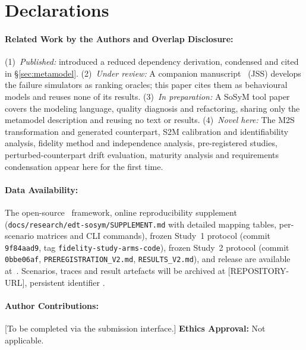 \section*{Declarations}



\paragraph{Related Work by the Authors and Overlap Disclosure:} (1)~\emph{Published:} \citet{yigit2025graph} introduced a reduced dependency derivation, condensed and cited in \S\ref{sec:metamodel}. (2)~\emph{Under review:} A companion manuscript~\citep{yigit2026jss} (JSS) develops the failure simulators as ranking oracles; this paper cites them as behavioural models and reuses none of its results. (3)~\emph{In preparation:} A SoSyM tool paper covers the modeling language, quality diagnosis and refactoring, sharing only the metamodel description and reusing no text or results. (4)~\emph{Novel here:} The M2S transformation and generated counterpart, S2M calibration and identifiability analysis, fidelity method and independence analysis, pre-registered studies, perturbed-counterpart drift evaluation, maturity analysis and requirements condensation appear here for the first time.

\paragraph{Data Availability:} The open-source \SaG\ framework, online reproducibility supplement (\texttt{docs/research/\allowbreak edt-sosym/\allowbreak SUPPLEMENT.md} with detailed mapping tables, per-scenario matrices and CLI commands), frozen Study~1 protocol (commit \texttt{9f84aad9}, tag \texttt{fidelity-study-\allowbreak arms-code}), frozen Study~2 protocol (commit \texttt{0bbe06af}, \texttt{PREREGISTRATION\_\allowbreak V2.md}, \texttt{RESULTS\_\allowbreak V2.md}), and release  are available at~\citep{sag-software}. Scenarios, traces and result artefacts will be archived at [REPOSITORY-URL], persistent identifier .

\paragraph{Author Contributions:} [To be completed via the submission interface.] \textbf{Ethics Approval:} Not applicable.
